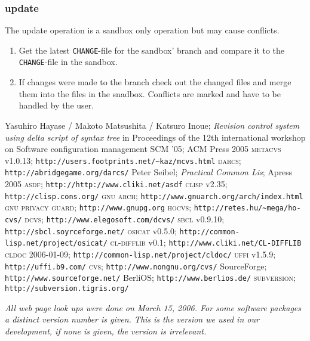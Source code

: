 \documentclass[fleqn, 10pt, a4paper]{report} \usepackage{amssymb}
\begin{document}
\subsubsection{update}

The update operation is a sandbox only operation but may cause
conflicts.

\begin{enumerate}
\item Get the latest \texttt{CHANGE}-file for the sandbox' branch and
  compare it to the \texttt{CHANGE}-file in the sandbox.
\item If changes were made to the branch check out the changed files
  and merge them into the files in the snadbox. Conflicts are marked
  and have to be handled by the user.
\end{enumerate}


\begin{thebibliography}{Clis06}
 Yasuhiro Hayase / Makoto Matsushita / Katsuro
  Inoue; \emph{Revision control system using delta script of syntax
    tree} in Proceedings of the 12th international workshop on
  Software configuration management SCM '05; ACM Press 2005
 \textsc{metacvs} v1.0.13;
  \texttt{http://users.footprints.net/\textasciitilde{}kaz/mcvs.html}
 \textsc{darcs};
  \texttt{http://abridgegame.org/darcs/}
 Peter Seibel; \emph{Practical Common Lis};
  Apress 2005
 \textsc{asdf};
  \texttt{http://http://www.cliki.net/asdf}
 \textsc{clisp} v2.35;
  \texttt{http://clisp.cons.org/}
 \textsc{gnu arch};
  \texttt{http://www.gnuarch.org/arch/index.html}
 \textsc{gnu privacy guard};
  \texttt{http://www.gnupg.org}
 \textsc{hocvs};
  \texttt{http://retes.hu/\textasciitilde{}mega/ho-cvs/}
 \textsc{dcvs};
  \texttt{http://www.elegosoft.com/dcvs/}
 \textsc{sbcl} v0.9.10;
  \texttt{http://sbcl.soyrceforge.net/}
 \textsc{osicat} v0.5.0;
  \texttt{http://common-lisp.net/project/osicat/}
 \textsc{cl-difflib} v0.1;
  \texttt{http://www.cliki.net/CL-DIFFLIB}
 \textsc{cldoc} 2006-01-09;
  \texttt{http://common-lisp.net/project/cldoc/}
 \textsc{uffi} v1.5.9;
  \texttt{http://uffi.b9.com/}
 \textsc{cvs};
  \texttt{http://www.nongnu.org/cvs/}
 SourceForge;
  \texttt{http://www.sourceforge.net/}
 BerliOS;
  \texttt{http://www.berlios.de/}
 \textsc{subversion};
  \texttt{http://subversion.tigris.org/}
\end{thebibliography}

\emph{All web page look ups were done on March 15, 2006.
For some software packages a distinct version number is given. This is
the version we used in our development, if none is given, the version
is irrelevant.}
\end{document}
